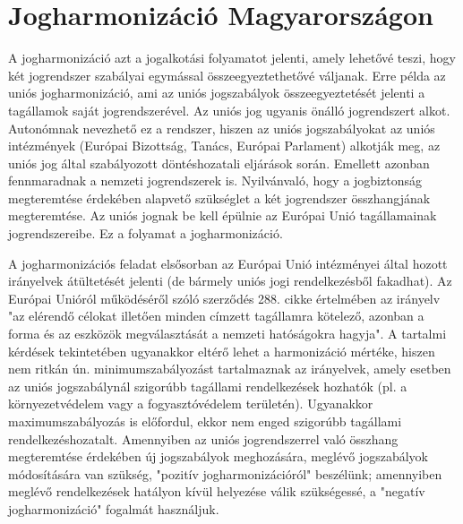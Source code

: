 \section{Jogharmonizáció Magyarországon} \label{jogharmonizacio}

A jogharmonizáció azt a jogalkotási folyamatot jelenti, amely lehetővé teszi, hogy két jogrendszer szabályai egymással összeegyeztethetővé váljanak. Erre példa az uniós jogharmonizáció, ami az uniós jogszabályok összeegyeztetését jelenti a tagállamok saját jogrendszerével. Az uniós jog ugyanis önálló jogrendszert alkot. Autonómnak nevezhető ez a rendszer, hiszen az uniós jogszabályokat az uniós intézmények (Európai Bizottság, Tanács, Európai Parlament) alkotják meg, az uniós jog által szabályozott döntéshozatali eljárások során. Emellett azonban fennmaradnak a nemzeti jogrendszerek is. Nyilvánvaló, hogy a jogbiztonság megteremtése érdekében alapvető szükséglet a két jogrendszer összhangjának megteremtése. Az uniós jognak be kell épülnie az Európai Unió tagállamainak jogrendszereibe. Ez a folyamat a jogharmonizáció.

A jogharmonizációs feladat elsősorban az Európai Unió intézményei által hozott irányelvek átültetését jelenti (de bármely uniós jogi rendelkezésből fakadhat). Az Európai Unióról működéséről szóló szerződés 288. cikke értelmében az irányelv "az elérendő célokat illetően minden címzett tagállamra kötelező, azonban a forma és az eszközök megválasztását a nemzeti hatóságokra hagyja". A tartalmi kérdések tekintetében ugyanakkor eltérő lehet a harmonizáció mértéke, hiszen nem ritkán ún. minimumszabályozást tartalmaznak az irányelvek, amely esetben az uniós jogszabálynál szigorúbb tagállami rendelkezések hozhatók (pl. a környezetvédelem vagy a fogyasztóvédelem területén). Ugyanakkor maximumszabályozás is előfordul, ekkor nem enged szigorúbb tagállami rendelkezéshozatalt. Amennyiben az uniós jogrendszerrel való összhang megteremtése érdekében új jogszabályok meghozására, meglévő jogszabályok módosítására van szükség, "pozitív jogharmonizációról" beszélünk; amennyiben meglévő rendelkezések hatályon kívül helyezése válik szükségessé, a "negatív jogharmonizáció" fogalmát használjuk.

